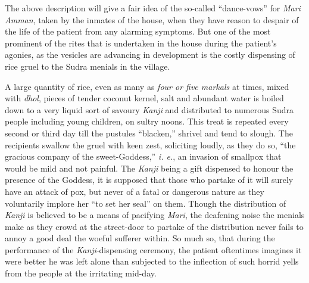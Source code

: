 \documentclass[a4paper, 12pt, oneside, english, twocolumn]{article}
\begin{document}
The above description will give a fair idea of the so-called ``dance-vows'' for \emph{Mari Amman}, taken by the inmates of the house, when they have reason to despair of the life of the patient from any alarming symptoms. But one of the most prominent of the rites that is undertaken in the house during the patient's agonies, as the vesicles are advancing in development is the costly dispensing of rice gruel to the Sudra menials in the village.

A large quantity of rice, even as many as \emph{four or five markals} at times, mixed with \emph{dhol}, pieces of tender coconut kernel, salt and abundant water is boiled down to a very liquid sort of savoury \emph{Kanji} and distributed to numerous Sudra people including young children, on sultry noons. This treat is repeated every second or third day till the pustules ``blacken,'' shrivel and tend to slough. The recipients swallow the gruel with keen zest, soliciting loudly, as they do so, ``the gracious company of the sweet-Goddess,'' \emph{i. e.}, an invasion of smallpox that would be mild and not painful. The \emph{Kanji} being a gift dispensed to honour the presence of the Goddess, it is supposed that those who partake of it will surely have an attack of pox, but never of a fatal or dangerous nature as they voluntarily implore her ``to set her seal'' on them. Though the distribution of \emph{Kanji} is believed to be a means of pacifying \emph{Mari}, the deafening noise the menials make as they crowd at the street-door to partake of the distribution never fails to annoy a good deal the woeful sufferer within. So much so, that during the performance of the \emph{Kanji}-dispensing ceremony, the patient oftentimes imagines it were better he was left alone than subjected to the inflection of such horrid yells from the people at the irritating mid-day.
\end{document}
